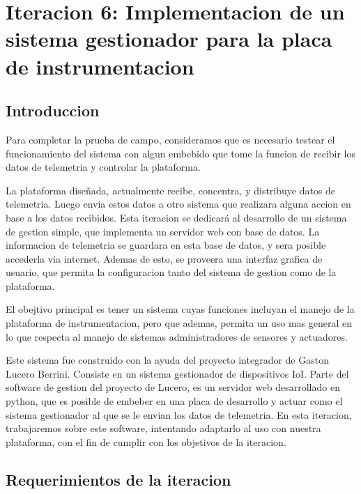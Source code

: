 \chapter{Iteracion 6: Implementacion de un sistema gestionador para la placa de instrumentacion} %
\label{cha:iteracion_6}

\section{Introduccion} %
\label{sec:introduccion}

Para completar la prueba de campo, consideramos que es necesario testear el funcionamiento del sistema con algun embebido que tome la funcion de recibir los datos de telemetria y controlar la plataforma.

La plataforma diseñada, actualmente recibe, concentra, y distribuye datos de telemetria. Luego envia estos datos a otro sistema que realizara alguna accion en base a los datos recibidos. Esta iteracion se dedicará al desarrollo de un sistema de gestion simple, que implementa un servidor web con base de datos. La informacion de telemetria se guardara en esta base de datos, y sera posible accederla via internet. Ademas de esto, se proveera una interfaz grafica de usuario, que permita la configuracion tanto del sistema de gestion como de la plataforma.

El obejtivo principal es tener un sistema cuyas funciones incluyan el manejo de la plataforma de instrumentacion, pero que ademas, permita un uso mas general en lo que respecta al manejo de sistemas administradores de sensores y actuadores.

Este sistema fue construido con la ayuda del proyecto integrador de Gaston Lucero Berrini. Consiste en un sistema gestionador de dispositivos IoI. Parte del software de gestion del proyecto de Lucero, es un servidor web desarrollado en python, que es posible de embeber en una placa de desarrollo y actuar como el sistema gestionador al que se le envian los datos de telemetria. En esta iteracion, trabajaremos sobre este software, intentando adaptarlo al uso con nuestra plataforma, con el fin de cumplir con los objetivos de la iteracion.


\section{Requerimientos de la iteracion} %
\label{sec:requerimientos_de_la_iteracion}

